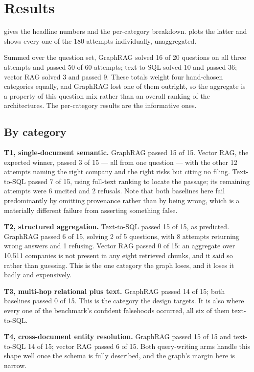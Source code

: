 \section{Results}
\label{sec:results}

 gives the headline numbers and  the per-category
breakdown.  plots the latter and  shows every one
of the 180 attempts individually, unaggregated.

Summed over the question set, GraphRAG solved 16 of 20 questions on all three
attempts and passed 50 of 60 attempts; text-to-SQL solved 10 and passed 36;
vector RAG solved 3 and passed 9. These totals weight four hand-chosen categories
equally, and GraphRAG lost one of them outright, so the aggregate is a property of
this question mix rather than an overall ranking of the architectures. The
per-category results are the informative ones.

\subsection{By category}

\textbf{T1, single-document semantic.} GraphRAG passed 15 of 15. Vector RAG, the
expected winner, passed 3 of 15 --- all from one question --- with the other 12
attempts naming the right company and the right risks but citing no filing.
Text-to-SQL passed 7 of 15, using full-text ranking to locate the passage; its
remaining attempts were 6 uncited and 2 refusals. Note that both baselines here
fail predominantly by omitting provenance rather than by being wrong, which is a
materially different failure from asserting something false.

\textbf{T2, structured aggregation.} Text-to-SQL passed 15 of 15, as predicted.
GraphRAG passed 6 of 15, solving 2 of 5 questions, with 8 attempts returning
wrong answers and 1 refusing. Vector RAG passed 0 of 15: an aggregate over
10{,}511 companies is not present in any eight retrieved chunks, and it said so
rather than guessing. This is the one category the graph loses, and it loses it
badly and expensively.

\textbf{T3, multi-hop relational plus text.} GraphRAG passed 14 of 15; both
baselines passed 0 of 15. This is the category the design targets. It is also
where every one of the benchmark's confident falsehoods occurred, all six of them
text-to-SQL.

\textbf{T4, cross-document entity resolution.} GraphRAG passed 15 of 15 and
text-to-SQL 14 of 15; vector RAG passed 6 of 15. Both query-writing arms handle
this shape well once the schema is fully described, and the graph's margin here
is narrow.


